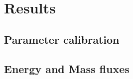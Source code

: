 \documentclass[utf8]{frontiersSCNS} %
\begin{document}

\section{Results} 
\subsection{Parameter calibration}

\subsection{Energy and Mass fluxes}
\end{document}
